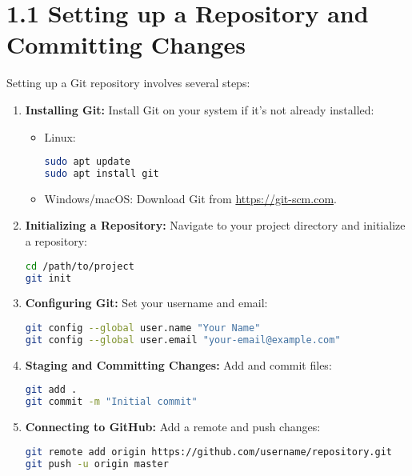 \documentclass[12pt]{article}
\begin{document}
\section*{1.1 Setting up a Repository and Committing Changes}
Setting up a Git repository involves several steps:
\begin{enumerate}
    \item \textbf{Installing Git:}
    Install Git on your system if it’s not already installed:
    \begin{itemize}
        \item Linux:
        \begin{lstlisting}[language=bash]
sudo apt update
sudo apt install git
        \end{lstlisting}
        \item Windows/macOS: Download Git from \url{https://git-scm.com}.
    \end{itemize}
    \item \textbf{Initializing a Repository:}
    Navigate to your project directory and initialize a repository:
    \begin{lstlisting}[language=bash]
cd /path/to/project
git init
    \end{lstlisting}
    \item \textbf{Configuring Git:}
    Set your username and email:
    \begin{lstlisting}[language=bash]
git config --global user.name "Your Name"
git config --global user.email "your-email@example.com"
    \end{lstlisting}
    \item \textbf{Staging and Committing Changes:}
    Add and commit files:
    \begin{lstlisting}[language=bash]
git add .
git commit -m "Initial commit"
    \end{lstlisting}
    \item \textbf{Connecting to GitHub:}
    Add a remote and push changes:
    \begin{lstlisting}[language=bash]
git remote add origin https://github.com/username/repository.git
git push -u origin master
    \end{lstlisting}
\end{enumerate}
\end{document}
